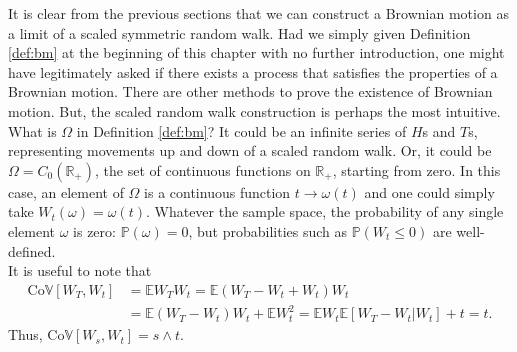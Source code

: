 \documentclass[12pt]{book}
\numberwithin{equation}{chapter}
\theoremstyle{plain}
\numberwithin{theorem}{section}
\theoremstyle{definition}
\numberwithin{exercise}{chapter}
\newcommand{\<}{\langle}
\renewcommand{\>}{\rangle}
\renewcommand{\(}{\left(}
\renewcommand{\)}{\right)}
\renewcommand{\[}{\left[}
\renewcommand{\]}{\right]}
\newcommand\Eb{\mathds{E}}
\newcommand\Pb{\mathds{P}}
\newcommand\Rb{\mathds{R}}
\newcommand\Vb{\mathds{V}}
\newcommand\om{\omega}
\newcommand\Om{\Omega}
\newcommand\Cv{\pmb{C}}
\begin{document}
\noindent
It is clear from the previous sections that we can construct a Brownian motion as a limit of a scaled symmetric random walk.  Had we simply given Definition \ref{def:bm} at the beginning of this chapter with no further introduction, one might have legitimately asked if there exists a process that satisfies the properties of a Brownian motion.  There are other methods to prove the existence of Brownian motion.  But, the scaled random walk construction is perhaps the most intuitive.
\\[0.5em]
What is $\Om$ in Definition \ref{def:bm}?  It could be an infinite series of $H$s and $T$s, representing movements up and down of a scaled random walk.  Or, it could be $\Om = C_0(\Rb_+)$, the set of continuous functions on $\Rb_+$, starting from zero.  In this case, an element of $\Om$ is a continuous function $t \to \om(t)$ and one could simply take $W_t(\om) = \om(t)$.  Whatever the sample space, the probability of any single element $\om$ is zero: $\Pb(\om)=0$, but probabilities such as $\Pb(W_t \leq 0)$ are well-defined.  
\\[0.5em]
It is useful to note that
\begin{align}
\text{Co}\Vb[W_T,W_t]
	&=	\Eb W_T W_t
	=		\Eb (W_T - W_t + W_t) W_t \\
	&=	\Eb (W_T - W_t) W_t + \Eb W_t^2 
	=	\Eb W_t \Eb[ W_T - W_t | W_t ] + t
	=		t . \label{eq:BM-Cov}
\end{align}  
Thus, $\text{Co}\Vb[W_s,W_t] = s \wedge t$.
\end{document}
